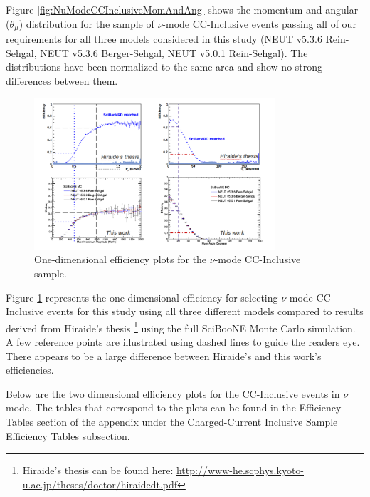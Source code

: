 \documentclass[11pt]{article}
\begin{document}
Figure \ref*{fig:NuModeCCInclusiveMomAndAng} shows the momentum and angular ($\theta_{\mu}$) distribution for the sample of $\nu$-mode CC-Inclusive events passing all of our requirements for all three models considered in this study (NEUT v5.3.6 Rein-Sehgal, NEUT v5.3.6 Berger-Sehgal, NEUT v5.0.1 Rein-Sehgal). The distributions have been normalized to the same area and show no strong differences between them. 

\begin{figure}[H]
\centering
\includegraphics[width=0.8\textwidth]{CCInclusivePlots/CC1DIncEff.png}
\caption{One-dimensional efficiency plots for the $\nu$-mode CC-Inclusive sample.}
\label{fig:OneDEfficiency}
\end{figure}

Figure \ref*{fig:OneDEfficiency} represents the one-dimensional efficiency for selecting $\nu$-mode CC-Inclusive events for this study using all three different models compared to results derived from Hiraide's thesis \footnote{Hiraide's thesis can be found here: \href{http://www-he.scphys.kyoto-u.ac.jp/theses/doctor/hiraide_dt.pdf}{http://www-he.scphys.kyoto-u.ac.jp/theses/doctor/hiraide\textunderscore{}dt.pdf}} using the full SciBooNE Monte Carlo simulation. A few reference points are illustrated using dashed lines to guide the readers eye. There appears to be a large difference between Hiraide's and this work's efficiencies.

Below are the two dimensional efficiency plots for the CC-Inclusive events in $\nu$ mode. The tables that correspond to the plots can be found in the Efficiency Tables section of the appendix under the Charged-Current Inclusive Sample Efficiency Tables subsection.
\end{document}
